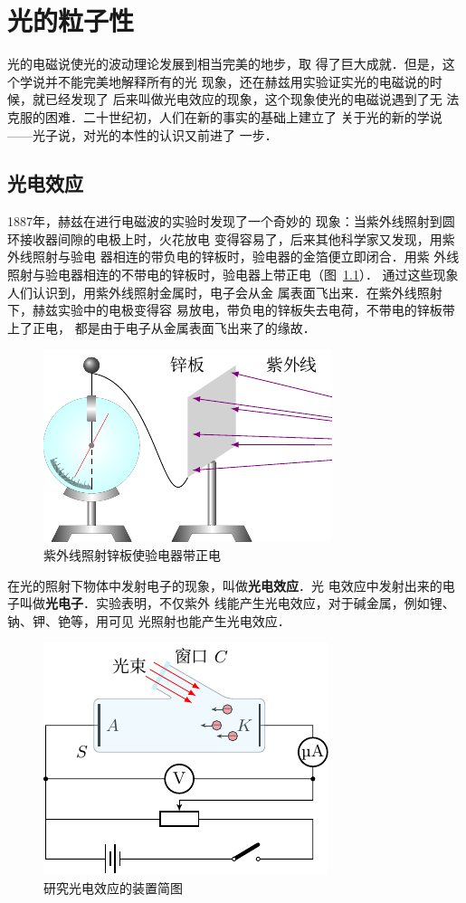 \chapter{光的粒子性}\label{chapter-particle-nature-of-light}

光的电磁说使光的波动理论发展到相当完美的地步，取
得了巨大成就．但是，这个学说并不能完美地解释所有的光
现象，还在赫兹用实验证实光的电磁说的时候，就已经发现了
后来叫做光电效应的现象，这个现象使光的电磁说遇到了无
法克服的困难．二十世纪初，人们在新的事实的基础上建立了
关于光的新的学说——光子说，对光的本性的认识又前进了
一步．


\section{光电效应}
1887年，赫兹在进行电磁波的实验时发现了一个奇妙的
现象：当紫外线照射到圆环接收器间隙的电极上时，火花放电
变得容易了，后来其他科学家又发现，用紫外线照射与验电
器相连的带负电的锌板时，验电器的金箔便立即闭合．用紫
外线照射与验电器相连的不带电的锌板时，验电器上带正电（图~\ref{fig_C_7-1}）．
通过这些现象人们认识到，用紫外线照射金属时，电子会从金
属表面飞出来．在紫外线照射下，赫兹实验中的电极变得容
易放电，带负电的锌板失去电荷，不带电的锌板带上了正电，
都是由于电子从金属表面飞出来了的缘故．
\begin{figure}[htbp]
    \centering
    \includegraphics{fig/C/7-1.pdf}
    \caption{紫外线照射锌板使验电器带正电}\label{fig_C_7-1}
\end{figure}

在光的照射下物体中发射电子的现象，叫做\textbf{光电效应}．光
电效应中发射出来的电子叫做\textbf{光电子}．实验表明，不仅紫外
线能产生光电效应，对于碱金属，例如锂、钠、钾、铯等，用可见
光照射也能产生光电效应．
\begin{figure}[htbp]
    \centering
    \includegraphics{fig/C/7-2.pdf}
    \caption{研究光电效应的装置简图}\label{fig_C_7-2}
\end{figure}

